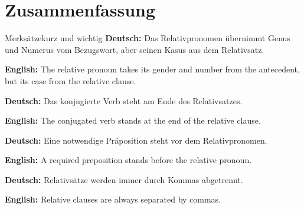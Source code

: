 \documentclass[a4paper,11pt]{article}
\newcommand{\GermanText}[1]{\textbf{Deutsch: }#1\par}
\newcommand{\EnglishText}[1]{{\small\color{SoftGray}\textbf{English: }#1\par}}
\begin{document}
    \section{Zusammenfassung}

        \begin{grammarentry}{Merksätze}{kurz und wichtig}
            \GermanText{Das Relativpronomen übernimmt Genus und Numerus vom Bezugswort, aber seinen Kasus aus dem Relativsatz.}
            \EnglishText{The relative pronoun takes its gender and number from the antecedent, but its case from the relative clause.}

            \GermanText{Das konjugierte Verb steht am Ende des Relativsatzes.}
            \EnglishText{The conjugated verb stands at the end of the relative clause.}

            \GermanText{Eine notwendige Präposition steht vor dem Relativpronomen.}
            \EnglishText{A required preposition stands before the relative pronoun.}

            \GermanText{Relativsätze werden immer durch Kommas abgetrennt.}
            \EnglishText{Relative clauses are always separated by commas.}
        \end{grammarentry}
\end{document}
